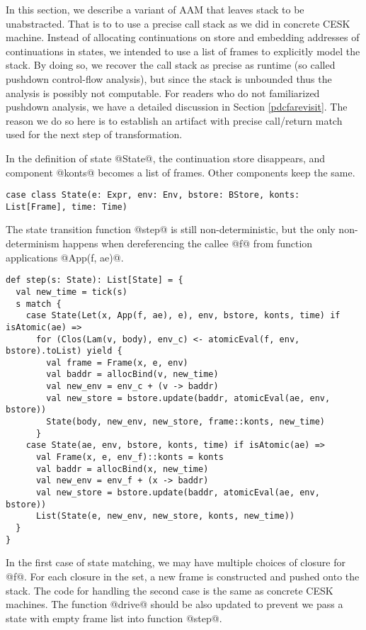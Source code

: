 \documentclass[acmsmall,review,anonymous]{acmart}\settopmatter{printfolios=true,printccs=false,printacmref=false}
\begin{document}
In this section, we describe a variant of AAM that leaves stack to be 
unabstracted. That is to to use a precise call stack as we did in concrete CESK machine. 
Instead of allocating continuations on store and embedding
addresses of continuations in states, we intended to use a list of frames
to explicitly model the stack.
By doing so, we recover the call stack as precise as runtime 
(so called pushdown control-flow analysis), but since 
the stack is unbounded thus the analysis is possibly not computable.
For readers who do not familiarized pushdown analysis, we have a detailed 
discussion in Section \ref{pdcfarevisit}.
The reason we do so here is to establish an artifact with precise call/return match
used for the next step of transformation.

In the definition of state @State@, the continuation store disappears, and
component @konts@ becomes a list of frames. Other components keep the same.

\begin{lstlisting}
case class State(e: Expr, env: Env, bstore: BStore, konts: List[Frame], time: Time)
\end{lstlisting}

The state transition function @step@ is still non-deterministic, but
the only non-determinism happens when dereferencing the callee @f@ 
from function applications @App(f, ae)@. 

\begin{lstlisting}
def step(s: State): List[State] = {
  val new_time = tick(s)
  s match {
    case State(Let(x, App(f, ae), e), env, bstore, konts, time) if isAtomic(ae) =>
      for (Clos(Lam(v, body), env_c) <- atomicEval(f, env, bstore).toList) yield {
        val frame = Frame(x, e, env)
        val baddr = allocBind(v, new_time)
        val new_env = env_c + (v -> baddr)
        val new_store = bstore.update(baddr, atomicEval(ae, env, bstore))
        State(body, new_env, new_store, frame::konts, new_time)
      }
    case State(ae, env, bstore, konts, time) if isAtomic(ae) =>
      val Frame(x, e, env_f)::konts = konts
      val baddr = allocBind(x, new_time)
      val new_env = env_f + (x -> baddr)
      val new_store = bstore.update(baddr, atomicEval(ae, env, bstore))
      List(State(e, new_env, new_store, konts, new_time))
  }
}
\end{lstlisting}

In the first case of state matching, we may have multiple choices of closure for @f@.
For each closure in the set, a new frame is constructed and pushed onto the stack.
The code for handling the second case is the same as concrete CESK machines.
The function @drive@ should be also updated to prevent we pass a state with
empty frame list into function @step@.
\end{document}
